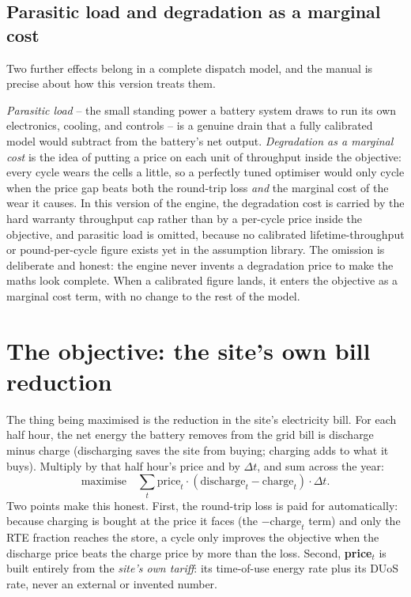 \subsection{Parasitic load and degradation as a marginal cost}

Two further effects belong in a complete dispatch model, and the manual is precise about how this version treats them.

\emph{Parasitic load} -- the small standing power a battery system draws to run its own electronics, cooling, and controls -- is a genuine drain that a fully calibrated model would subtract from the battery's net output. \emph{Degradation as a marginal cost} is the idea of putting a price on each unit of throughput inside the objective: every cycle wears the cells a little, so a perfectly tuned optimiser would only cycle when the price gap beats both the round-trip loss \emph{and} the marginal cost of the wear it causes. In this version of the engine, the degradation cost is carried by the hard warranty throughput cap rather than by a per-cycle price inside the objective, and parasitic load is omitted, because no calibrated lifetime-throughput or pound-per-cycle figure exists yet in the assumption library. The omission is deliberate and honest: the engine never invents a degradation price to make the maths look complete. When a calibrated figure lands, it enters the objective as a marginal cost term, with no change to the rest of the model.

\section{The objective: the site's own bill reduction}

The thing being maximised is the reduction in the site's electricity bill. For each half hour, the net energy the battery removes from the grid bill is discharge minus charge (discharging saves the site from buying; charging adds to what it buys). Multiply by that half hour's price and by $\Delta t$, and sum across the year:
\[
\text{maximise} \quad \sum_t \text{price}_t \cdot (\text{discharge}_t - \text{charge}_t) \cdot \Delta t .
\]
Two points make this honest. First, the round-trip loss is paid for automatically: because charging is bought at the price it faces (the $-\text{charge}_t$ term) and only the RTE fraction reaches the store, a cycle only improves the objective when the discharge price beats the charge price by more than the loss. Second, \textbf{price}$_t$ is built entirely from the \emph{site's own tariff}: its time-of-use energy rate plus its DUoS rate, never an external or invented number.

